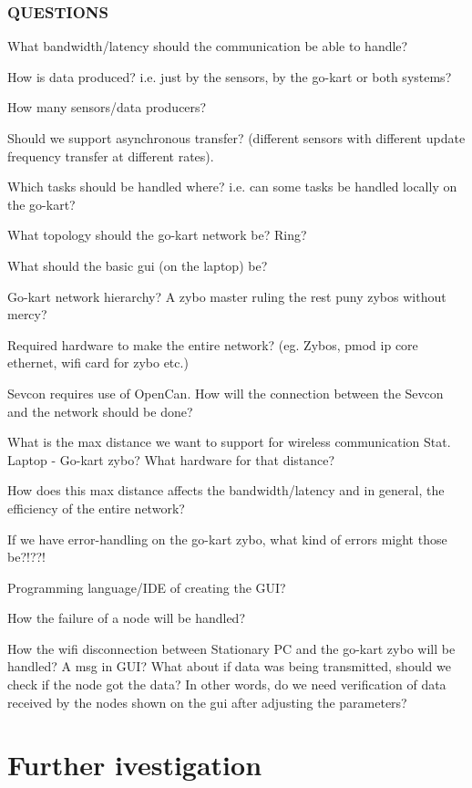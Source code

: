 \subsubsection{QUESTIONS}
\begin{list}{Questions}
\item What bandwidth/latency should the communication be able to handle?
\item How is data produced? i.e. just by the sensors, by the go-kart or both systems?
\item How many sensors/data producers?\\
\item Should we support asynchronous transfer? (different sensors with different 
update frequency transfer at different rates).\\
\item Which tasks should be handled where? i.e. can some tasks be handled locally on 
the go-kart?
\item What topology should the go-kart network be? Ring?
\item What should the basic gui (on the laptop) be?
\item Go-kart network hierarchy? A zybo master ruling the rest puny zybos without mercy?
\item Required hardware to make the entire network? (eg. Zybos, pmod ip core ethernet, wifi card for zybo etc.)
\item Sevcon requires use of OpenCan. How will the connection between the Sevcon and the network should be done?
\item What is the max distance we want to support for wireless communication Stat. Laptop - Go-kart zybo? What hardware for that distance?
\item How does this max distance affects the bandwidth/latency and in general, the efficiency of the entire network?
\item If we have error-handling on the go-kart zybo, what kind of errors might those be?!??!
\item Programming language/IDE of creating the GUI?
\item How the failure of a node will be handled?
\item How the wifi disconnection between Stationary PC and the go-kart zybo will be handled? A msg in GUI? What about if data was being transmitted, should we check if the node got the data? In other words, do we need verification of data received by the nodes shown on the gui after adjusting the parameters?
\end{list}


\section{Further ivestigation}
